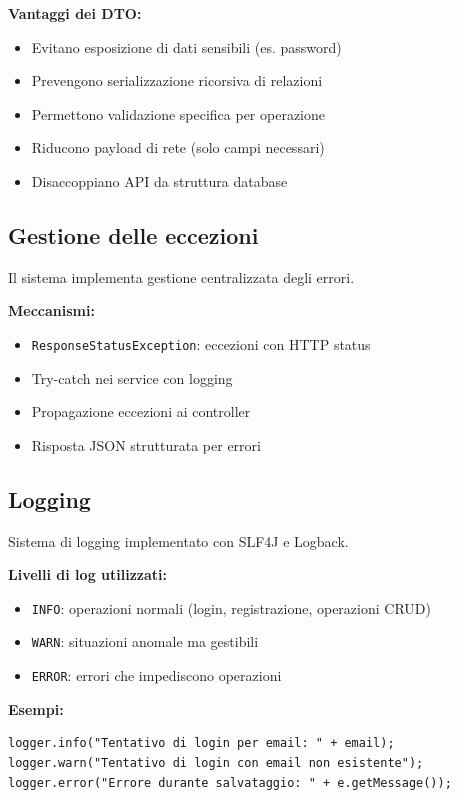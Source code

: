 \documentclass{report}
\begin{document}
\textbf{Vantaggi dei DTO:}
\begin{itemize}
    \item Evitano esposizione di dati sensibili (es. password)
    \item Prevengono serializzazione ricorsiva di relazioni
    \item Permettono validazione specifica per operazione
    \item Riducono payload di rete (solo campi necessari)
    \item Disaccoppiano API da struttura database
\end{itemize}

\subsection{Gestione delle eccezioni}

Il sistema implementa gestione centralizzata degli errori.

\textbf{Meccanismi:}
\begin{itemize}
    \item \texttt{ResponseStatusException}: eccezioni con HTTP status
    \item Try-catch nei service con logging
    \item Propagazione eccezioni ai controller
    \item Risposta JSON strutturata per errori
\end{itemize}


\subsection{Logging}

Sistema di logging implementato con SLF4J e Logback.

\textbf{Livelli di log utilizzati:}
\begin{itemize}
    \item \texttt{INFO}: operazioni normali (login, registrazione, operazioni CRUD)
    \item \texttt{WARN}: situazioni anomale ma gestibili
    \item \texttt{ERROR}: errori che impediscono operazioni
\end{itemize}

\textbf{Esempi:}
\begin{verbatim}
logger.info("Tentativo di login per email: " + email);
logger.warn("Tentativo di login con email non esistente");
logger.error("Errore durante salvataggio: " + e.getMessage());
\end{verbatim}
\end{document}
